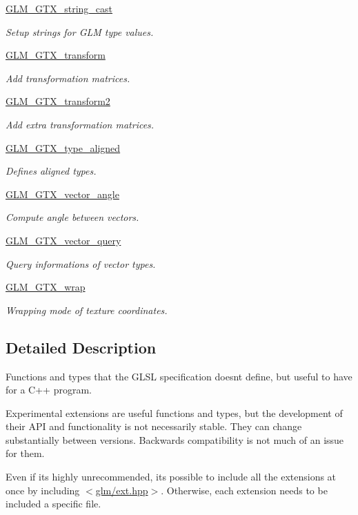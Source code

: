 \begin{DoxyCompactItemize}
\hyperlink{group__gtx__string__cast}{G\+L\+M\+\_\+\+G\+T\+X\+\_\+string\+\_\+cast}
\begin{DoxyCompactList}\small\item\em Setup strings for G\+L\+M type values. \end{DoxyCompactList}\item 
\hyperlink{group__gtx__transform}{G\+L\+M\+\_\+\+G\+T\+X\+\_\+transform}
\begin{DoxyCompactList}\small\item\em Add transformation matrices. \end{DoxyCompactList}\item 
\hyperlink{group__gtx__transform2}{G\+L\+M\+\_\+\+G\+T\+X\+\_\+transform2}
\begin{DoxyCompactList}\small\item\em Add extra transformation matrices. \end{DoxyCompactList}\item 
\hyperlink{group__gtx__type__aligned}{G\+L\+M\+\_\+\+G\+T\+X\+\_\+type\+\_\+aligned}
\begin{DoxyCompactList}\small\item\em Defines aligned types. \end{DoxyCompactList}\item 
\hyperlink{group__gtx__vector__angle}{G\+L\+M\+\_\+\+G\+T\+X\+\_\+vector\+\_\+angle}
\begin{DoxyCompactList}\small\item\em Compute angle between vectors. \end{DoxyCompactList}\item 
\hyperlink{group__gtx__vector__query}{G\+L\+M\+\_\+\+G\+T\+X\+\_\+vector\+\_\+query}
\begin{DoxyCompactList}\small\item\em Query informations of vector types. \end{DoxyCompactList}\item 
\hyperlink{group__gtx__wrap}{G\+L\+M\+\_\+\+G\+T\+X\+\_\+wrap}
\begin{DoxyCompactList}\small\item\em Wrapping mode of texture coordinates. \end{DoxyCompactList}\end{DoxyCompactItemize}


\subsection{Detailed Description}
Functions and types that the G\+L\+S\+L specification doesn\textquotesingle{}t define, but useful to have for a C++ program. 

Experimental extensions are useful functions and types, but the development of their A\+P\+I and functionality is not necessarily stable. They can change substantially between versions. Backwards compatibility is not much of an issue for them.

Even if it\textquotesingle{}s highly unrecommended, it\textquotesingle{}s possible to include all the extensions at once by including $<$\hyperlink{ext_8hpp}{glm/ext.\+hpp}$>$. Otherwise, each extension needs to be included a specific file. 